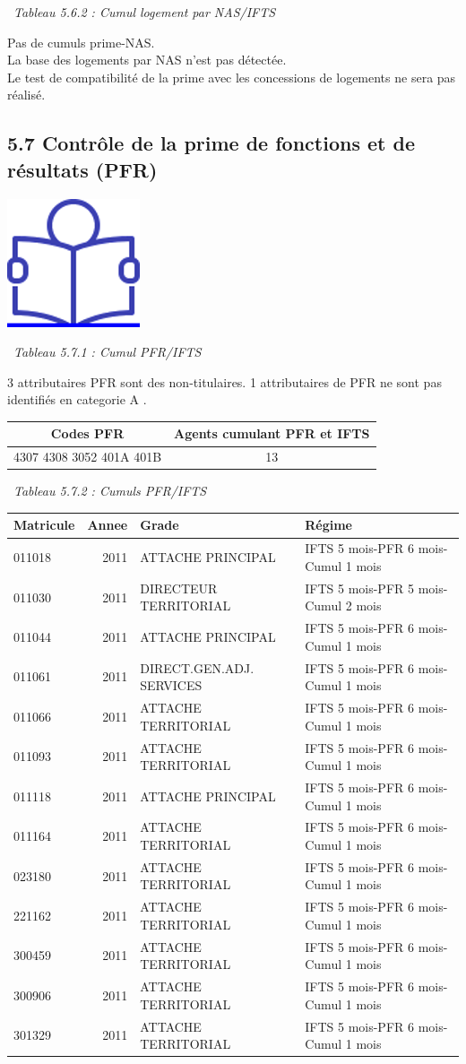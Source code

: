 ~\emph{Tableau 5.6.2 : Cumul logement par NAS/IFTS}

Pas de cumuls prime-NAS.\\
La base des logements par NAS n'est pas détectée.\\
Le test de compatibilité de la prime avec les concessions de logements
ne sera pas réalisé.

\hypertarget{controle-de-la-prime-de-fonctions-et-de-resultats-pfr}{%
\subsection{5.7 Contrôle de la prime de fonctions et de résultats
(PFR)}\label{controle-de-la-prime-de-fonctions-et-de-resultats-pfr}}

\href{../Docs/Notices/fiche_PFR.odt}{\includegraphics{icones/Notice.png}}

~\emph{Tableau 5.7.1 : Cumul PFR/IFTS}

3 attributaires PFR sont des non-titulaires. 1 attributaires de PFR ne
sont pas identifiés en categorie A .

\begin{longtable}[]{@{}cc@{}}
\toprule
Codes PFR & Agents cumulant PFR et IFTS\tabularnewline
\midrule
\endhead
4307 4308 3052 401A 401B & 13\tabularnewline
\bottomrule
\end{longtable}

~\emph{Tableau 5.7.2 : Cumuls PFR/IFTS}

\begin{longtable}[]{@{}lrll@{}}
\toprule
Matricule & Annee & Grade & Régime\tabularnewline
\midrule
\endhead
011018 & 2011 & ATTACHE PRINCIPAL & IFTS 5 mois-PFR 6 mois-Cumul 1
mois\tabularnewline
011030 & 2011 & DIRECTEUR TERRITORIAL & IFTS 5 mois-PFR 5 mois-Cumul 2
mois\tabularnewline
011044 & 2011 & ATTACHE PRINCIPAL & IFTS 5 mois-PFR 6 mois-Cumul 1
mois\tabularnewline
011061 & 2011 & DIRECT.GEN.ADJ. SERVICES & IFTS 5 mois-PFR 6 mois-Cumul
1 mois\tabularnewline
011066 & 2011 & ATTACHE TERRITORIAL & IFTS 5 mois-PFR 6 mois-Cumul 1
mois\tabularnewline
011093 & 2011 & ATTACHE TERRITORIAL & IFTS 5 mois-PFR 6 mois-Cumul 1
mois\tabularnewline
011118 & 2011 & ATTACHE PRINCIPAL & IFTS 5 mois-PFR 6 mois-Cumul 1
mois\tabularnewline
011164 & 2011 & ATTACHE TERRITORIAL & IFTS 5 mois-PFR 6 mois-Cumul 1
mois\tabularnewline
023180 & 2011 & ATTACHE TERRITORIAL & IFTS 5 mois-PFR 6 mois-Cumul 1
mois\tabularnewline
221162 & 2011 & ATTACHE TERRITORIAL & IFTS 5 mois-PFR 6 mois-Cumul 1
mois\tabularnewline
300459 & 2011 & ATTACHE TERRITORIAL & IFTS 5 mois-PFR 6 mois-Cumul 1
mois\tabularnewline
300906 & 2011 & ATTACHE TERRITORIAL & IFTS 5 mois-PFR 6 mois-Cumul 1
mois\tabularnewline
301329 & 2011 & ATTACHE TERRITORIAL & IFTS 5 mois-PFR 6 mois-Cumul 1
mois\tabularnewline
\bottomrule
\end{longtable}

